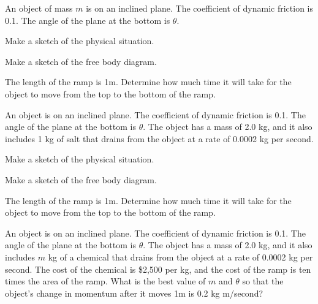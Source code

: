 
\begin{problem}
\item An object of mass $m$ is on an inclined plane. The coefficient
  of dynamic friction is 0.1. The angle of the plane at the bottom is
  $\theta$.
  \begin{subproblem}
  \item Make a sketch of the physical situation.
    \vfill
  \item Make a sketch of the free body diagram.
    \vfill
  \item The length of the ramp is 1m. Determine how much time it will
    take for the object to move from the top to the bottom of the
    ramp.
    \vfill
  \end{subproblem}
\end{problem}


\begin{problem}
\item An object is on an inclined plane. The coefficient of dynamic
  friction is 0.1. The angle of the plane at the bottom is
  $\theta$. The object has a mass of 2.0 kg, and it also includes 1 kg
  of salt that drains from the object at a rate of 0.0002 kg per
  second.
  \begin{subproblem}
  \item Make a sketch of the physical situation.  
    \vfill
  \item Make a sketch of the free body diagram.
    \vfill
  \item The length of the ramp is 1m. Determine how much time it will
    take for the object to move from the top to the bottom of the
    ramp.  
    \vfill
  \end{subproblem}
\end{problem}

\begin{problem}
\item An object is on an inclined plane. The coefficient of dynamic
  friction is 0.1. The angle of the plane at the bottom is
  $\theta$. The object has a mass of 2.0 kg, and it also includes $m$ kg
  of a chemical that drains from the object at a rate of 0.0002 kg per
  second. The cost of the chemical is \$2,500 per kg, and the cost of
  the ramp is ten times the area of the ramp. What is the best value
  of $m$ and $\theta$ so that the object's change in momentum after it
  moves 1m is 0.2 kg m/second?

  \vfill

\end{problem}

